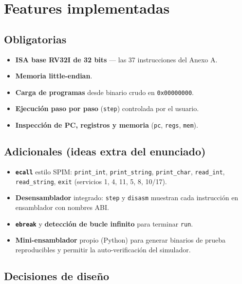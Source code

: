 \documentclass[11pt,a4paper]{article}
\newcommand{\code}[1]{\texttt{#1}}
\begin{document}
\section{Features implementadas}

\subsection{Obligatorias}

\begin{itemize}[noitemsep,topsep=2pt]
  \item[\checkmark] \textbf{ISA base RV32I de 32 bits} --- las 37 instrucciones
        del Anexo A.
  \item[\checkmark] \textbf{Memoria little-endian}.
  \item[\checkmark] \textbf{Carga de programas} desde binario crudo en
        \code{0x00000000}.
  \item[\checkmark] \textbf{Ejecución paso por paso} (\code{step}) controlada por
        el usuario.
  \item[\checkmark] \textbf{Inspección de PC, registros y memoria} (\code{pc},
        \code{regs}, \code{mem}).
\end{itemize}

\subsection{Adicionales (ideas extra del enunciado)}

\begin{itemize}[noitemsep,topsep=2pt]
  \item[\checkmark] \textbf{\code{ecall}} estilo SPIM: \code{print\_int},
        \code{print\_string}, \code{print\_char}, \code{read\_int},
        \code{read\_string}, \code{exit} (servicios 1, 4, 11, 5, 8, 10/17).
  \item[\checkmark] \textbf{Desensamblador} integrado: \code{step} y
        \code{disasm} muestran cada instrucción en ensamblador con nombres ABI.
  \item[\checkmark] \textbf{\code{ebreak}} y \textbf{detección de bucle infinito}
        para terminar \code{run}.
  \item[\checkmark] \textbf{Mini-ensamblador} propio (Python) para generar
        binarios de prueba reproducibles y permitir la auto-verificación del
        simulador.
\end{itemize}

\subsection{Decisiones de diseño}
\end{document}
